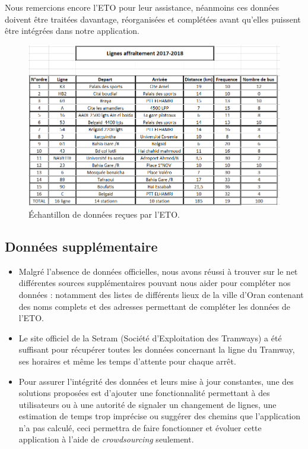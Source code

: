 Nous remercions encore l'ETO pour leur assistance, néanmoins ces données doivent être traitées davantage, réorganisées et complétées avant qu'elles puissent être intégrées dans notre application.

\begin{figure}
	\center
	\includegraphics[scale=0.7]{img/LignesETO.png}
	\caption{Échantillon de données reçues par l'ETO.}
	\label{fig:ETO}
\end{figure}

\subsection{Données supplémentaire}
	\begin{itemize}
		\item Malgré l'absence de données officielles, nous avons réussi à trouver sur le net différentes sources supplémentaires pouvant nous aider pour compléter nos données : notamment des listes de différents lieux de la ville d'Oran contenant des noms complets et des adresses permettant de compléter les données de l'ETO.
		\item Le site officiel de la Setram (Société d'Exploitation des Tramways) a été suffisant pour récupérer toutes les données concernant la ligne du Tramway, ses horaires et même les temps d'attente pour chaque arrêt.
		\item Pour assurer l'intégrité des données et leurs mise à jour constantes, une des solutions proposées est d'ajouter une fonctionnalité permettant à des utilisateurs ou à une autorité de signaler un changement de lignes, une estimation de temps trop imprécise ou suggérer des chemins que l'application n'a pas calculé, ceci permettra de faire fonctionner et évoluer cette application à l'aide de \emph{crowdsourcing} seulement.
	\end{itemize}

